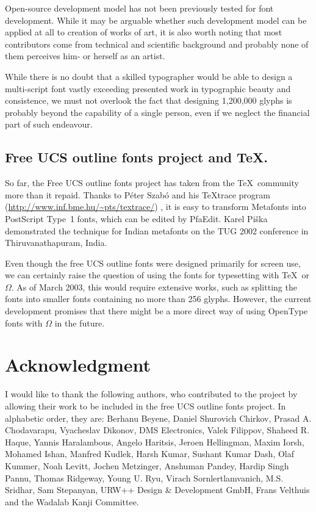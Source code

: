\documentclass[english]{eurotex2003}
\begin{document}
Open-source development model has not been previously tested for font
development. While it may be arguable whether such development model
can be applied at all to creation of works of art, it is also worth
noting that most contributors come from technical and scientific
background and probably none of them perceives him- or herself as an
artist.

While there is no doubt that a skilled typographer would be able to
design a multi-script font vastly exceeding presented work in
typographic beauty and consistence, we must not overlook the fact that
designing 1,200,000 glyphs is probably beyond the capability of a
single person, even if we neglect the financial part of such
endeavour.

\subsection{Free UCS outline fonts project and \TeX.}
So far, the Free UCS outline fonts project has taken from the \TeX\
community more than it repaid. Thanks to P\'eter Szab\'o and his
{\TeX}trace program (\url{http://www.inf.bme.hu/~pts/textrace/})
\cite{Szabo:TeXtrace}, it is easy to transform Metafonts into
PostScript Type~1 fonts, which can be edited by PfaEdit. Karel
Pi\v{s}ka demonstrated the technique for Indian metafonts on the TUG
2002 conference in Thiruvanathapuram, India.

Even though the free UCS outline fonts were designed primarily for
screen use, we can certainly raise the question of using the fonts for
typesetting with \TeX\ or $\Omega$. As of March 2003, this would
require extensive works, such as splitting the fonts into smaller
fonts containing no more than 256 glyphs. However, the current
development \cite{Bella-Mehta} promises that there might be a more
direct way of using OpenType fonts with $\Omega$ in the future.

\section{Acknowledgment}

I would like to thank the following authors, who contributed to the
project by allowing their work to be included in the free UCS outline
fonts project. In alphabetic order, they are: Berhanu Beyene, Daniel
Shurovich Chirkov, Prasad A. Chodavarapu, Vyacheslav Dikonov, DMS
Electronics, Valek Filippov, Shaheed R. Haque, Yannis Haralambous,
Angelo Haritsis, Jeroen Hellingman, Maxim Iorsh, Mohamed Ishan,
Manfred Kudlek, Harsh Kumar, Sushant Kumar Dash, Olaf Kummer, Noah
Levitt, Jochen Metzinger, Anshuman Pandey, Hardip Singh Pannu, Tho\-mas
Ridgeway, Young U. Ryu, Virach Sornlertlamvanich, M.S. Sridhar, Sam
Stepanyan, URW++ Design \& Development GmbH, Frans Velthuis and the Wadalab
Kanji Committee.





\end{document}
